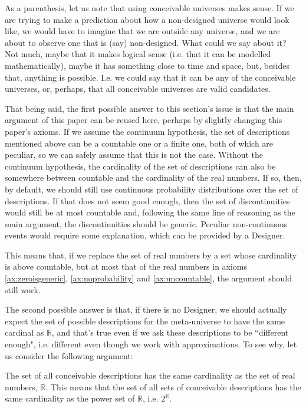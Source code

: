 \documentclass[a4paper
]{article}
\def\reale{\mathbb{R}}
\newcommand{\paper}[1]{paper}
\newcommand{\ghilimele}[1]{``#1"}
\begin{document}
As a parenthesis, let us note that using conceivable universes makes sense.
If we are
trying to make a prediction about how a non-designed universe would
look like, we would have to imagine that we are outside any universe, and we are
about to observe one that is (say) non-designed. What could we say about it?
Not much, maybe that it makes logical sense (i.e. that it can be modelled
mathematically), maybe it has something close to time and space, but,
besides that, anything is possible.
I.e. we could say that it can be any
of the conceivable universes, or, perhaps,
that all conceivable universes are valid candidates.

That being said, the first possible answer to this section's issue
is that the main argument of this \paper{} can be reused here,
perhaps by slightly changing this \paper{}'s
axioms.
If we assume the continuum hypothesis, the set of descriptions mentioned
above can be a countable one or a finite one, both of which are peculiar,
so we can safely assume that this is not the case.
Without the continuum hypothesis, the cardinality of the set of descriptions
can also be somewhere between countable and the cardinality of the real numbers.
If so, then, by default, we should still use continuous
probability distributions over the set of descriptions.
If that does not seem good enough, then
the set of discontinuities would still be at most countable and,
following the same line of reasoning as the main argument, the discontinuities
should be generic.
Peculiar non-continuous events would require some explanation,
which can be provided by a Designer.

This means that, if we replace the set of real numbers by a set whose
cardinality is above countable, but at most that of the real numbers
in axioms \ref{ax:zeroisgeneric}, \ref{ax:noprobability} and
\ref{ax:uncountable}, the argument should still work.

The second possible answer is that, if there is no Designer, we should actually
expect the set of
possible descriptions for the meta-universe to have the same cardinal as
$\reale$, and that's true even
if we ask these descriptions to be \ghilimele{different enough},
i.e. different even though we work with approximations.
To see why, let us consider the following argument:

The set of all conceivable descriptions has the same cardinality as the
set of real numbers, $\reale$. This means that the
set of all sets of conceivable descriptions
has the same cardinality as the power set of $\reale$, i.e. $2^\reale$.
\end{document}
